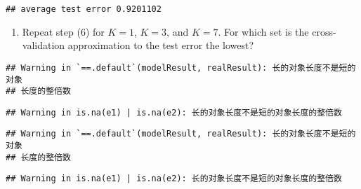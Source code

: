 \documentclass[]{article}
\newenvironment{Shaded}{\begin{snugshade}}{\end{snugshade}}
\newcommand{\CommentTok}[1]{\textcolor[rgb]{0.56,0.35,0.01}{\textit{#1}}}
\newcommand{\ControlFlowTok}[1]{\textcolor[rgb]{0.13,0.29,0.53}{\textbf{#1}}}
\newcommand{\DataTypeTok}[1]{\textcolor[rgb]{0.13,0.29,0.53}{#1}}
\newcommand{\DecValTok}[1]{\textcolor[rgb]{0.00,0.00,0.81}{#1}}
\newcommand{\KeywordTok}[1]{\textcolor[rgb]{0.13,0.29,0.53}{\textbf{#1}}}
\newcommand{\NormalTok}[1]{#1}
\newcommand{\OperatorTok}[1]{\textcolor[rgb]{0.81,0.36,0.00}{\textbf{#1}}}
\newcommand{\StringTok}[1]{\textcolor[rgb]{0.31,0.60,0.02}{#1}}
\providecommand{\tightlist}{%
  \setlength{\itemsep}{0pt}\setlength{\parskip}{0pt}}
\begin{document}
\begin{verbatim}
## average test error 0.9201102
\end{verbatim}

\begin{enumerate}
\def\labelenumi{\arabic{enumi}.}
\setcounter{enumi}{6}
\tightlist
\item
  Repeat step (6) for \(K = 1\), \(K=3\), and \(K=7\). For which set is
  the cross-validation approximation to the test error the lowest?
\end{enumerate}

\begin{Shaded}
\end{Shaded}

\begin{verbatim}
## Warning in `==.default`(modelResult, realResult): 长的对象长度不是短的对象
## 长度的整倍数
\end{verbatim}

\begin{verbatim}
## Warning in is.na(e1) | is.na(e2): 长的对象长度不是短的对象长度的整倍数
\end{verbatim}

\begin{verbatim}
## Warning in `==.default`(modelResult, realResult): 长的对象长度不是短的对象
## 长度的整倍数
\end{verbatim}

\begin{verbatim}
## Warning in is.na(e1) | is.na(e2): 长的对象长度不是短的对象长度的整倍数
\end{verbatim}
\end{document}
